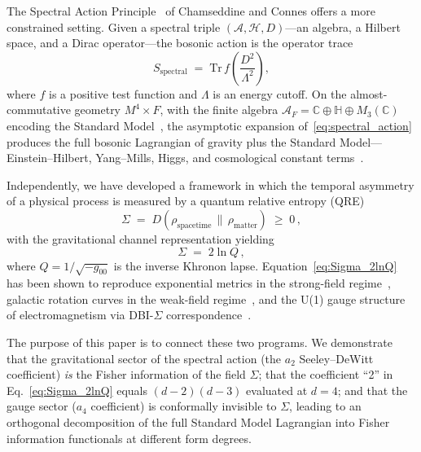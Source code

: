 \documentclass[prd,twocolumn,superscriptaddress,longbibliography]{revtex4-2}
\newcommand{\Tr}{\mathrm{Tr}}
\newcommand{\AF}{\mathcal{A}_F}
\begin{document}
The Spectral Action Principle~\cite{CC1997} of Chamseddine and
Connes offers a more constrained setting.
Given a spectral triple $(\mathcal{A},\mathcal{H},D)$---an
algebra, a Hilbert space, and a Dirac operator---the bosonic
action is the operator trace
\begin{equation}\label{eq:spectral_action}
  S_{\mathrm{spectral}}
  \;=\;
  \Tr\, f\!\left(\frac{D^2}{\Lambda^2}\right),
\end{equation}
where $f$ is a positive test function and $\Lambda$ is an
energy cutoff.
On the almost-commutative geometry
$M^4\times F$, with the finite algebra
$\AF = \mathbb{C}\oplus\mathbb{H}\oplus M_3(\mathbb{C})$
encoding the Standard Model~\cite{CCM2007,ConnesMarcolli2008},
the asymptotic expansion of~\eqref{eq:spectral_action}
produces the full bosonic Lagrangian of
gravity plus the Standard Model---Einstein--Hilbert,
Yang--Mills, Higgs, and cosmological constant
terms~\cite{CC1997,vS2024}.

Independently, we have developed a framework in which the
temporal asymmetry of a physical process is measured by a quantum
relative entropy (QRE)~\cite{PaperI}
\begin{equation}\label{eq:Sigma_def}
  \Sigma
  \;=\;
  D\!\left(\rho_{\mathrm{spacetime}}
  \,\big\|\, \rho_{\mathrm{matter}}\right)
  \;\geq\; 0\,,
\end{equation}
with the gravitational channel representation
yielding~\cite{PaperII}
\begin{equation}\label{eq:Sigma_2lnQ}
  \Sigma \;=\; 2\ln Q\,,
\end{equation}
where $Q = 1/\sqrt{-g_{00}}$ is the inverse Khronon
lapse.
Equation~\eqref{eq:Sigma_2lnQ} has been shown to reproduce
exponential metrics in the strong-field
regime~\cite{PaperII}, galactic rotation curves in the
weak-field regime~\cite{PaperIII}, and the U(1) gauge
structure of electromagnetism via DBI-$\Sigma$
correspondence~\cite{PaperVI}.

The purpose of this paper is to connect these two programs.
We demonstrate that the gravitational sector of the spectral
action (the $a_2$ Seeley--DeWitt coefficient) \emph{is} the
Fisher information of the field $\Sigma$; that the coefficient
``2'' in Eq.~\eqref{eq:Sigma_2lnQ} equals $(d-2)(d-3)$
evaluated at $d=4$; and that the gauge sector ($a_4$
coefficient) is conformally invisible to $\Sigma$, leading to
an orthogonal decomposition of the full Standard Model
Lagrangian into Fisher information functionals at different
form degrees.
\end{document}
